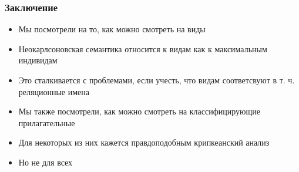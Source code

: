 \documentclass[
    9pt,
]{beamer}
\begin{document}
\begin{frame}
    \frametitle{Заключение}

    \begin{itemize}
        \item Мы посмотрели на то, как можно смотреть на виды
        \item Неокарлсоновская семантика относится к видам как к максимальным индивидам
        \item Это сталкивается с проблемами, если учесть, что видам соответсвуют в т. ч. реляционные имена
        \item Мы также посмотрели, как можно смотреть на классифицирующие прилагательные
        \item Для некоторых из них кажется правдоподобным крипкеанский анализ
        \item Но не для всех
    \end{itemize}

\end{frame}
\end{document}
